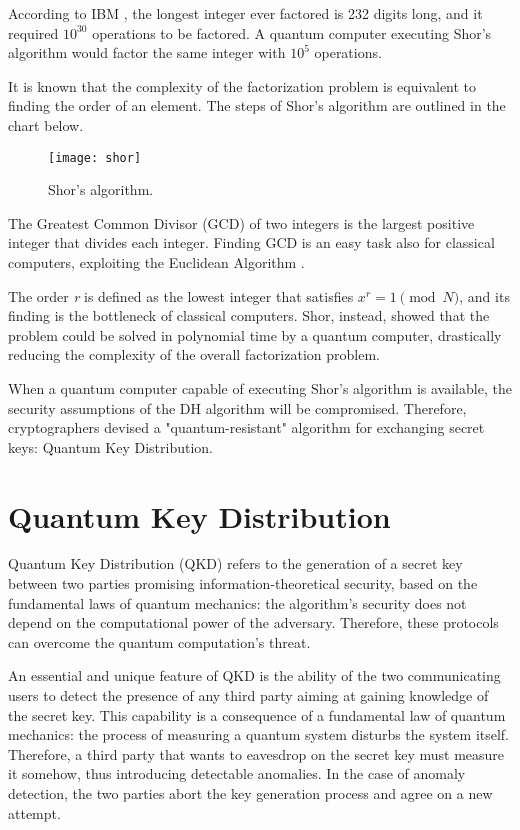 According to IBM \cite{ibm}, the longest integer ever factored is 232 digits long, and it required $10^{30}$ operations to be factored. A quantum computer executing Shor's algorithm would factor the same integer with $10^5$ operations.

It is known \cite{shor-order} that the complexity of the factorization problem is equivalent to finding the order of an element. The steps of Shor's algorithm are outlined in the chart below.

\begin{figure}[H]
    \centering
    \texttt{[image: shor]}
    \caption{Shor's algorithm.}
    \label{fig:shor}
\end{figure}

The Greatest Common Divisor (GCD) of two integers is the largest positive integer that divides each integer. Finding GCD is an easy task also for classical computers, exploiting the Euclidean Algorithm \cite{knuth}.

The order \textit{r} is defined as the lowest integer that satisfies $x^r = 1 \pmod N$, and its finding is the bottleneck of classical computers. Shor, instead, showed that the problem could be solved in polynomial time by a quantum computer, drastically reducing the complexity of the overall factorization problem.

When a quantum computer capable of executing Shor's algorithm is available, the security assumptions of the DH algorithm will be compromised. Therefore, cryptographers devised a "quantum-resistant" algorithm for exchanging secret keys: Quantum Key Distribution.

\section{Quantum Key Distribution}
Quantum Key Distribution (QKD) refers to the generation of a secret key between two parties promising information-theoretical security, based on the fundamental laws of quantum mechanics: the algorithm's security does not depend on the computational power of the adversary. Therefore, these protocols can overcome the quantum computation's threat.

An essential and unique feature of QKD is the ability of the two communicating users to detect the presence of any third party aiming at gaining knowledge of the secret key. This capability is a consequence of a fundamental law of quantum mechanics: the process of measuring a quantum system disturbs the system itself. Therefore, a third party that wants to eavesdrop on the secret key must measure it somehow, thus introducing detectable anomalies. In the case of anomaly detection, the two parties abort the key generation process and agree on a new attempt.

